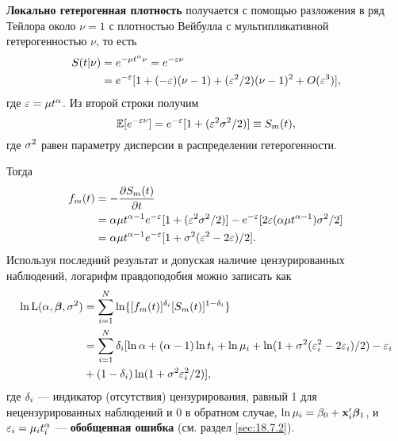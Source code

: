 \textbf{Локально гетерогенная плотность} получается с помощью разложения в ряд Тейлора около $\nu = 1$ с плотностью Вейбулла с мультипликативной гетерогенностью $\nu$, то есть
    \begin{align}
        S(t|\nu) &= e^{-\mu t^{\alpha}\nu} = e^{-\varepsilon\nu} \notag \\
                 &= e^{-\varepsilon}[1 + (-\varepsilon)(\nu - 1) + (\varepsilon^2/2)(\nu - 1)^2 + O(\varepsilon^3)], \notag
    \end{align}
где $\varepsilon = \mu t^{\alpha}$. Из второй строки получим
    $$\mathbb{E}[e^{-\varepsilon\nu}] = e^{-\varepsilon}[1 + (\varepsilon^2\sigma^2/2)] \equiv S_m(t),$$
где $\sigma^2$ равен параметру дисперсии в распределении гетерогенности.

Тогда
    \begin{align}
        f_m(t) &= - \frac{\partial S_m(t)}{\partial t} \notag \\
               &= \alpha\mu t^{\alpha-1}e^{-\varepsilon}[1 + (\varepsilon^2\sigma^2/2)] - e^{-\varepsilon}[2\varepsilon(\alpha\mu t^{\alpha-1})\sigma^2/2] \notag \\
               &= \alpha\mu t^{\alpha-1}e^{-\varepsilon}[1 + \sigma^2(\varepsilon^2-2\varepsilon)/2]. \notag
    \end{align}
Используя последний результат и допуская наличие цензурированных наблюдений, логарифм правдоподобия можно записать как
    \begin{align}
        \ln\mathrm{L} (\alpha, \bm{\beta}, \sigma^2) &= \sum^{N}_{i=1}\ln\{[f_m(t)]^{\delta_i}[S_m(t)]^{1-\delta_i}\} \notag \\
                                &= \sum^{N}_{i=1}\delta_i[\ln\alpha + (\alpha-1)\ln t_i + \ln\mu_i +\ln(1 + \sigma^2(\varepsilon^{2}_{i}-2\varepsilon_i)/2) - \varepsilon_i \notag\\
                                &  + (1-\delta_i)\ln(1 + \sigma^2\varepsilon^{2}_{i}/2)], \notag
    \end{align}
где $\delta_i$ --- индикатор (отсутствия) цензурирования, равный 1 для нецензурированных наблюдений и 0 в обратном случае, $\ln\mu_i = \beta_0 + \mathbf{x}_i'\bm{\beta}_1$, и $\varepsilon_i = \mu_i t_i^\alpha$ --- \textbf{обобщенная ошибка} (см. раздел \ref{sec:18.7.2}).

